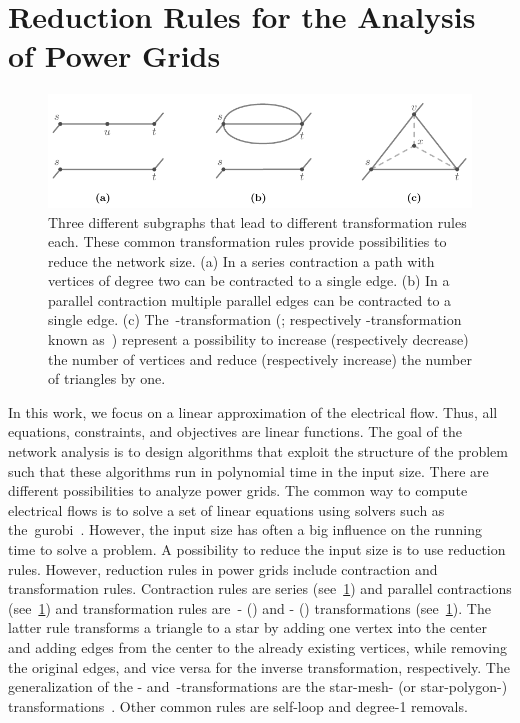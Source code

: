 \section{Reduction Rules for the Analysis of Power Grids}
\label{ch:related-work:sec:analyses}
% 
\begin{figure}
    \includegraphics{relatedwork/figures/transformation.pdf}
    \caption[Common network reduction rules.]{Three different
    subgraphs that lead to different transformation rules each. These common
    transformation rules provide possibilities to reduce the network size. (a)
    In a series contraction a path with vertices of degree two can be contracted
    to a single edge. (b) In a parallel contraction multiple parallel edges can
    be contracted to a single edge. (c) The~-transformation
    (; respectively -transformation
    known as~) represent a possibility to increase
    (respectively decrease) the number of vertices and reduce (respectively
    increase) the number of triangles by one.
    }
    \label{ch:realted-work:fig:transformation}
\end{figure}
% 
In this work, we focus on a linear approximation of the electrical flow. Thus,
all equations, constraints, and objectives are linear functions. The goal of the
network analysis is to design algorithms that exploit the structure of the
problem such that these algorithms run in polynomial time in the input size.
There are different possibilities to analyze power grids. The common way to
compute electrical flows is to solve a set of linear equations using solvers
such as the~\gls{gurobi}~\parencite{online:Gurobi,gurobi}. However, the input
size has often a big influence on the running time to solve a problem. A
possibility to reduce the input size is to use reduction rules. However,
reduction rules in power grids include contraction and transformation rules.
Contraction rules are series
(see~\cref{ch:realted-work:fig:transformation}) and parallel
contractions (see~\cref{ch:realted-work:fig:transformation}) and
transformation rules are~- () and
- () transformations
(see~\cref{ch:realted-work:fig:transformation}). The latter rule
transforms a triangle to a star by adding one vertex into the center and adding
edges from the center to the already existing vertices, while removing the
original edges, and vice versa for the inverse transformation, respectively. The
generalization of the -
and~-transformations are the star-mesh- (or star-polygon-)
transformations~\parencite{Lie73,Bed61}. Other common rules are self-loop and
degree-1 removals.

